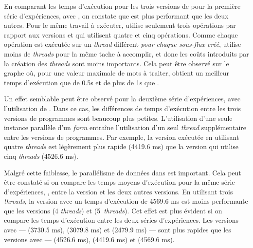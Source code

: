 En comparant les temps d'ex\'ecution pour les trois versions de  pour la premi\`ere s\'erie d'exp\'eriences, avec , on constate que  est plus performant que les deux autres. Pour le m\^eme travail \`a ex\'ecuter,  utilise seulement trois op\'erations par rapport aux versions  et  qui utilisent quatre et cinq opérations. Comme chaque op\'eration est ex\'ecut\'ee sur un \emph{thread} diff\'erent \emph{pour chaque sous-flux cr\'e\'e},  utilise moins de \emph{threads} pour la m\^eme tache \`a accomplir, et donc les co\^uts introduits par la cr\'eation des \emph{threads} sont moins importants. Cela peut \^etre observ\'e sur le graphe o\`u, pour une valeur maximale de mots \`a traiter,  obtient un meilleur temps d'ex\'ecution que  de 0.5s et de plus de 1s que . 

Un effet semblable peut \^etre observ\'e pour la deuxi\`eme s\'erie d'exp\'eriences, avec l'utilisation de . Dans ce cas, les diff\'erences de temps d'ex\'ecution entre les trois versions de programmes sont beaucoup plus petites. L'utilisation d'une seule instance parall\`ele d'un \emph{farm} entra\^ine l'utilisation d'un seul \emph{thread} suppl\'ementaire entre les versions de programmes. Par exemple, la version  ex\'ecut\'ee en utilisant quatre \emph{threads} est légèrement plus rapide (4419.6 ms) que la version  qui utilise cinq \emph{threads} (4526.6 ms). 

Malgr\'e cette faiblesse, le parall\'elisme de données dans  est important. Cela peut \^etre constat\'e si on compare les temps moyens d'ex\'ecution pour la m\^eme s\'erie d'exp\'eriences, , entre la version  et les deux autres versions. En utilisant trois \emph{threads}, la version  avec un temps d'ex\'ecution de 4569.6 ms est moins performante que les versions  (4 \emph{threads}) et  (5~\emph{threads}). Cet effet est plus \'evident si on compare les temps d'ex\'ecution entre les deux s\'eries d'exp\'eriences. Les versions avec  --- \ppffs{} (3730.5 ms), \ppff{} (3079.8 ms) et \ppffm{} (2479.9 ms) --- sont plus rapides que les versions avec  --- \ppffs{} (4526.6 ms), \ppff{} (4419.6 ms) et \ppffm{} (4569.6 ms).




